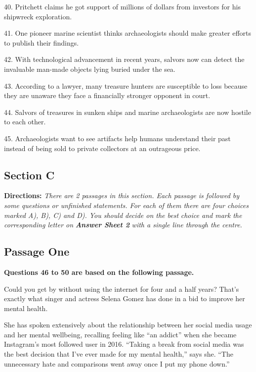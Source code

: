 \documentclass[UTF8,11pt]{ctexart}
\begin{document}
40. Pritchett claims he got support of millions of dollars from investors for his shipwreck exploration.


41. One pioneer marine scientist thinks archaeologists should make greater efforts to publish their findings.


42. With technological advancement in recent years, salvors now can detect the invaluable man-made objects lying buried under the sea.


43. According to a lawyer, many treasure hunters are susceptible to loss because they are unaware they face a financially stronger opponent in court.


44. Salvors of treasures in sunken ships and marine archaeologists are now hostile to each other.


45. Archaeologists want to see artifacts help humans understand their past instead of being sold to private collectors at an outrageous price.


\subsection*{\textbf{Section C}}


\textbf{Directions: }\textit{There are 2 passages in this section. Each passage is followed by some questions or unfinished} \textit{statements. For each of them there are four choices marked A), B), C) and D). You should decide on the best} \textit{choice and mark the corresponding letter on }\textbf{\textit{Answer Sheet 2}}\textit{ with a single line through the centre.}


\subsection*{\textbf{Passage One}}


\textbf{Questions 46 to 50 are based on the following passage.}


Could you get by without using the internet for four and a half years? That’s exactly what singer and actress Selena Gomez has done in a bid to improve her mental health.


She has spoken extensively about the relationship between her social media usage and her mental wellbeing, recalling feeling like “an addict” when she became Instagram’s most followed user in 2016. “Taking a break from social media was the best decision that I’ve ever made for my mental health,” says she. “The unnecessary hate and comparisons went away once I put my phone down.”
\end{document}
